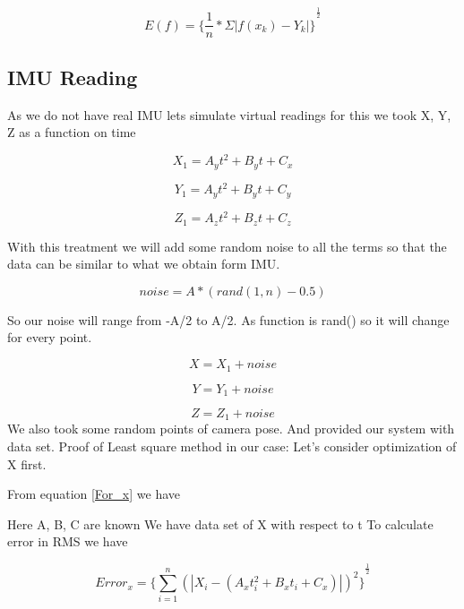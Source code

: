 \begin{equation}
E(f)={\lbrace\frac{1}{n}*\Sigma|f(x_k)-Y_k|\rbrace}^\frac{1}{2} 
\end{equation}

\subsection{IMU Reading}
As we do not have real IMU lets simulate virtual readings for this we took X, Y, Z as a function on time 

\begin{equation}
\label{For_x}
X_1=A_y t^2+B_y t +C_x
\end{equation}

\begin{equation}
Y_1=A_y t^2+B_y t +C_y
\end{equation}

\begin{equation}
Z_1=A_z t^2+B_z t +C_z
\end{equation}

With this treatment we will add some random noise to all the terms so that the data can be similar to what we obtain form IMU.

\begin{equation}
noise=A*(rand(1,n)-0.5)
\end{equation}

So our noise will range from -A/2 to A/2.
As function is rand() so it will change for every point.

\begin{equation}
X=X_1+noise
\end{equation}

\begin{equation}
Y=Y_1+noise
\end{equation}

\begin{equation}
Z=Z_1+noise
\end{equation}
We also took some random points of camera pose. And provided our system with data set.
Proof of Least square method in our case:
Let’s consider optimization of X first.
 
From equation \eqref{For_x} we have

Here A, B, C are known
We have data set of X with respect to t
To calculate error in RMS we have
 
\begin{equation} 
 Error_x={\lbrace\displaystyle\sum_{i=1}^{n}(|X_i-(A_xt_i^2+B_x t_i +C_x)|)^2\rbrace}^\frac{1}{2} 
\end{equation}


